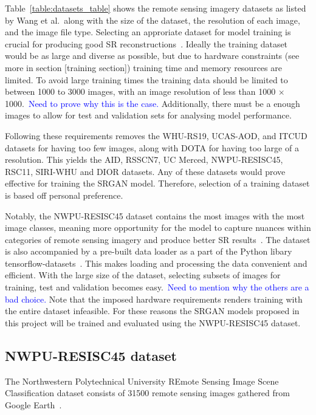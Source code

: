 Table~\ref{table:datasets_table} shows the remote sensing imagery datasets as listed by Wang et al.\ along with the size of the dataset, the resolution of each image, and the image file type. Selecting an approriate dataset for model training is crucial for producing good SR reconstructions~\cite{ref}. Ideally the training dataset would be as large and diverse as possible, but due to hardware constraints (see more in section [training section]) training time and memory resources are limited. To avoid large training times the training data should be limited to between 1000 to 3000 images, with an image resolution of less than 1000 $\times$ 1000.\ \textcolor{blue}{Need to prove why this is the case.} Additionally, there must be a enough images to allow for test and validation sets for analysing model performance.

Following these requirements removes the WHU-RS19, UCAS-AOD, and ITCUD datasets for having too few images, along with DOTA for having too large of a resolution. This yields the AID, RSSCN7, UC Merced, NWPU-RESISC45, RSC11, SIRI-WHU and DIOR datasets. Any of these datasets would prove effective for training the SRGAN model. Therefore, selection of a training dataset is based off personal preference. 

Notably, the NWPU-RESISC45 dataset contains the most images with the most image classes, meaning more opportunity for the model to capture nuances within categories of remote sensing imagery and produce better SR results~\cite{ref}. The dataset is also accompanied by a pre-built data loader as a part of the Python libary tensorflow-datasets~\cite{ref}. This makes loading and processing the data convenient and efficient. With the large size of the dataset, selecting subsets of images for training, test and validation becomes easy.\ \textcolor{blue}{Need to mention why the others are a bad choice.} Note that the imposed hardware requirements renders training with the entire dataset infeasible. For these reasons the SRGAN models proposed in this project will be trained and evaluated using the NWPU-RESISC45 dataset.

\subsection{NWPU-RESISC45 dataset}\label{subsec:resisc45}
The Northwestern Polytechnical University REmote Sensing Image Scene Classification dataset consists of 31500 remote sensing images gathered from Google Earth~\cite{resisc45}. 

